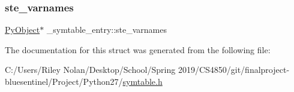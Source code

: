 \mbox{\label{struct__symtable__entry_a7c4f7b2d6a187257a2966cf80c447d62}} 
\subsubsection{\texorpdfstring{ste\_varnames}{ste\_varnames}}
{\footnotesize\ttfamily \mbox{\hyperlink{_python27_2object_8h_aadc84ac7aed2cfa6f20c25f62bf3dac7}{Py\+Object}}$\ast$ \+\_\+symtable\+\_\+entry\+::ste\+\_\+varnames}



The documentation for this struct was generated from the following file\+:\begin{DoxyCompactItemize}
\item 
C\+:/\+Users/\+Riley Nolan/\+Desktop/\+School/\+Spring 2019/\+C\+S4850/git/finalproject-\/bluesentinel/\+Project/\+Python27/\mbox{\hyperlink{symtable_8h}{symtable.\+h}}\end{DoxyCompactItemize}
